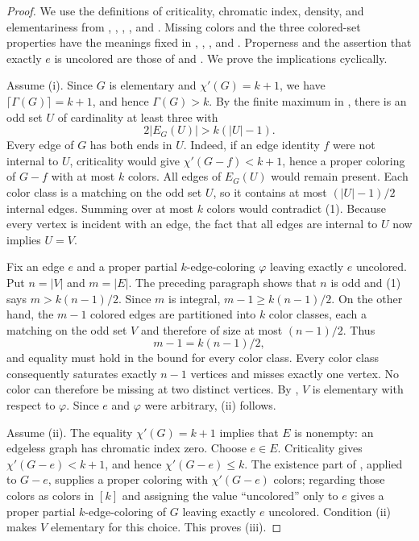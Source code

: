 \begin{proof}
We use the definitions of criticality, chromatic index, density, and
elementariness from , ,
, , and .  Missing
colors and the three colored-set properties have the meanings fixed in
, ,
, and
.  Properness and the assertion that
exactly $e$ is uncolored are those of  and
.  We prove the implications cyclically.

Assume (i).  Since $G$ is elementary and $\chi'(G)=k+1$, we have
$\lceil\Gamma(G)\rceil=k+1$, and hence $\Gamma(G)>k$.  By the finite maximum
in , there is an odd set $U$ of cardinality at least three
with
\[
  2|E_G(U)|>k(|U|-1).                                      \tag{1}
\]
Every edge of $G$ has both ends in $U$.  Indeed, if an edge identity $f$
were not internal to $U$, criticality would give
$\chi'(G-f)<k+1$, hence a proper coloring of $G-f$ with at most $k$ colors.
All edges of $E_G(U)$ would remain present.  Each color class is a matching
on the odd set $U$, so it contains at most $(|U|-1)/2$ internal edges.
Summing over at most $k$ colors would contradict (1).  Because every vertex
is incident with an edge, the fact that all edges are internal to $U$ now
implies $U=V$.

Fix an edge $e$ and a proper partial $k$-edge-coloring $\varphi$ leaving
exactly $e$ uncolored.  Put $n=|V|$ and $m=|E|$.  The preceding paragraph
shows that $n$ is odd and (1) says $m>k(n-1)/2$.  Since $m$ is integral,
$m-1\geq k(n-1)/2$.  On the other hand, the $m-1$ colored edges are
partitioned into $k$ color classes, each a matching on the odd set $V$ and
therefore of size at most $(n-1)/2$.  Thus
\[
  m-1=k(n-1)/2,
\]
and equality must hold in the bound for every color class.  Every color
class consequently saturates exactly $n-1$ vertices and misses exactly one
vertex.  No color can therefore be missing at two distinct vertices.  By
, $V$ is elementary with respect to
$\varphi$.  Since $e$ and $\varphi$ were arbitrary, (ii) follows.

Assume (ii).  The equality $\chi'(G)=k+1$ implies that $E$ is nonempty:
an edgeless graph has chromatic index zero.  Choose $e\in E$.  Criticality
gives $\chi'(G-e)<k+1$, and hence $\chi'(G-e)\leq k$.  The existence part of
, applied to $G-e$, supplies a proper coloring
with $\chi'(G-e)$ colors; regarding those colors as colors in $[k]$ and
assigning the value ``uncolored'' only to $e$ gives a proper partial
$k$-edge-coloring of $G$ leaving exactly $e$ uncolored.  Condition (ii)
makes $V$ elementary for this choice.  This proves (iii).


\end{proof}
